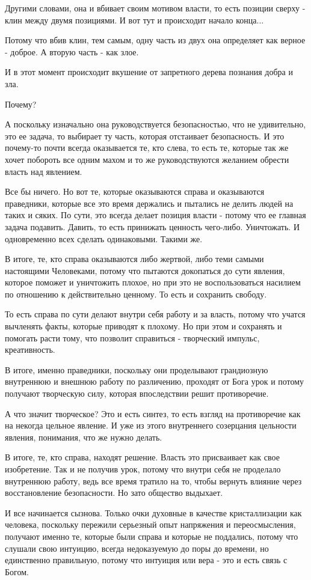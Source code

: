 Другими словами, она и вбивает своим мотивом власти, то есть позиции сверху -
клин между двумя позициями. И вот тут и происходит начало конца...

Потому что вбив клин, тем самым, одну часть из двух она определяет как верное -
доброе. А вторую часть - как злое. 

И в этот момент происходит вкушение от запретного дерева познания добра и зла. 

Почему? 

А поскольку изначально она руководствуется безопасностью, что не удивительно,
это ее задача, то выбирает ту часть, которая отстаивает безопасность. И это
почему-то почти всегда оказывается те, кто слева, то есть те, которые так же
хочет побороть все одним махом и то же руководствуются желанием обрести власть
над явлением. 

Все бы ничего. Но вот те, которые оказываются справа и оказываются праведники,
которые все это время держались и пытались не делить людей на таких и сяких. По
сути, это всегда делает позиция власти - потому что ее главная задача подавить.
Давить, то есть принижать ценность чего-либо. Уничтожать. И одновременно всех
сделать одинаковыми. Такими же. 

В итоге, те, кто справа оказываются либо жертвой, либо теми самыми настоящими
Человеками, потому что пытаются докопаться до сути явления, которое поможет и
уничтожить плохое, но при это не воспользоваться насилием по отношению к
действительно ценному. То есть и сохранить свободу. 

То есть справа по сути делают внутри себя работу и за власть, потому что учатся
вычленять факты, которые приводят к плохому. Но при этом и сохранять и помогать
расти тому, что позволит справиться - творческий импульс, креативность. 

В итоге, именно праведники, поскольку они проделывают грандиозную внутреннюю и
внешнюю работу по различению, проходят от Бога урок и потому получают
творческую силу, которая впоследствии решит противоречие. 

А что значит творческое? Это и есть синтез, то есть взгляд на противоречие как
на некогда цельное явление. И уже из этого внутреннего созерцания цельности
явления, понимания, что же нужно делать. 

В итоге, те, кто справа, находят решение. Власть это присваивает как свое
изобретение. Так и не получив урок, потому что внутри себя не проделало
внутреннюю работу, ведь все время тратило на то, чтобы вернуть влияние через
восстановление безопасности. Но зато общество выдыхает. 

И все начинается сызнова. Только очки духовные в качестве кристаллизации как
человека, поскольку пережили серьезный опыт напряжения и переосмысления,
получают именно те, которые были справа и которые не поддались, потому что
слушали свою интуицию, всегда недоказуемую до поры до времени, но единственно
правильную, потому что интуиция или вера - это и есть связь с Богом.
